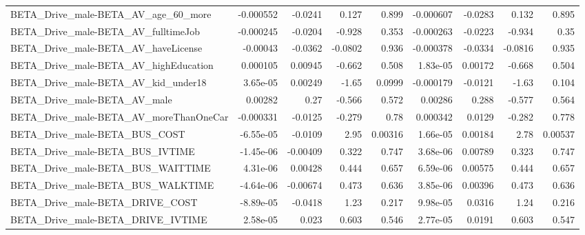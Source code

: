 \begin{tabular}{lrrrrrrrr}
BETA\_Drive\_male-BETA\_AV\_age\_60\_more                &   -0.000552 &      -0.0241 &    0.127 &    0.899 &  -0.000607 &     -0.0283 &        0.132 &         0.895 \\
BETA\_Drive\_male-BETA\_AV\_fulltimeJob                &   -0.000245 &      -0.0204 &   -0.928 &    0.353 &  -0.000263 &     -0.0223 &       -0.934 &          0.35 \\
BETA\_Drive\_male-BETA\_AV\_haveLicense                &    -0.00043 &      -0.0362 &  -0.0802 &    0.936 &  -0.000378 &     -0.0334 &      -0.0816 &         0.935 \\
BETA\_Drive\_male-BETA\_AV\_highEducation              &    0.000105 &      0.00945 &   -0.662 &    0.508 &   1.83e-05 &     0.00172 &       -0.668 &         0.504 \\
BETA\_Drive\_male-BETA\_AV\_kid\_under18                &    3.65e-05 &      0.00249 &    -1.65 &   0.0999 &  -0.000179 &     -0.0121 &        -1.63 &         0.104 \\
BETA\_Drive\_male-BETA\_AV\_male                       &     0.00282 &         0.27 &   -0.566 &    0.572 &    0.00286 &       0.288 &       -0.577 &         0.564 \\
BETA\_Drive\_male-BETA\_AV\_moreThanOneCar             &   -0.000331 &      -0.0125 &   -0.279 &     0.78 &   0.000342 &      0.0129 &       -0.282 &         0.778 \\
BETA\_Drive\_male-BETA\_BUS\_COST                      &   -6.55e-05 &      -0.0109 &     2.95 &  0.00316 &   1.66e-05 &     0.00184 &         2.78 &       0.00537 \\
BETA\_Drive\_male-BETA\_BUS\_IVTIME                    &   -1.45e-06 &     -0.00409 &    0.322 &    0.747 &   3.68e-06 &     0.00789 &        0.323 &         0.747 \\
BETA\_Drive\_male-BETA\_BUS\_WAITTIME                  &    4.31e-06 &      0.00428 &    0.444 &    0.657 &   6.59e-06 &     0.00575 &        0.444 &         0.657 \\
BETA\_Drive\_male-BETA\_BUS\_WALKTIME                  &   -4.64e-06 &     -0.00674 &    0.473 &    0.636 &   3.85e-06 &     0.00396 &        0.473 &         0.636 \\
BETA\_Drive\_male-BETA\_DRIVE\_COST                    &   -8.89e-05 &      -0.0418 &     1.23 &    0.217 &   9.98e-05 &      0.0316 &         1.24 &         0.216 \\
BETA\_Drive\_male-BETA\_DRIVE\_IVTIME                  &    2.58e-05 &        0.023 &    0.603 &    0.546 &   2.77e-05 &      0.0191 &        0.603 &         0.547 \\

\end{tabular}
